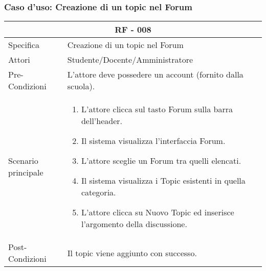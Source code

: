\documentclass{article}
\begin{document}
\subsubsection{\textbf{Caso d'uso: Creazione di un topic nel Forum}}
\begin{tabular}{ |p{3cm}|p{9cm}|  }
	\hline
	\multicolumn{2}{|c|}{\textbf{RF - 008}} \\
	\hline
	Specifica& Creazione di un topic nel Forum\\
	\hline
	Attori& Studente/Docente/Amministratore\\
	\hline
	Pre-Condizioni& L'attore deve possedere un account (fornito dalla scuola).\\
	\hline
	Scenario principale& \begin{enumerate}
		\item L'attore clicca sul tasto Forum sulla barra dell'header.
		\item Il sistema visualizza l'interfaccia Forum.
		\item L'attore sceglie un Forum tra quelli elencati.
		\item Il sistema visualizza i Topic esistenti in quella categoria.
		\item L'attore clicca su Nuovo Topic ed inserisce l'argomento della discussione.
	\end{enumerate}\\
	\hline
	Post-Condizioni& Il topic viene aggiunto con successo.\\
	\hline
\end{tabular}
\end{document}
